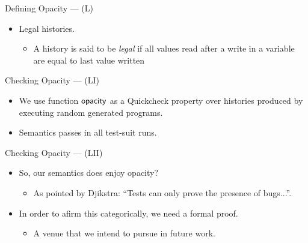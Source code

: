 \documentclass[14pt]{beamer}
\newcommand{\F}[1]{\green{\mathsf{#1}}}
\begin{document}
\begin{frame}{Defining Opacity --- (L)}
   \begin{itemize}
      \item Legal histories.
      \begin{itemize}
         \item A history is said to be \emph{legal}
               if all values read after a write in a variable
               are equal to last value written
      \end{itemize}
   \end{itemize}
\end{frame}
\begin{frame}{Checking Opacity --- (LI)}
   \begin{itemize}
      \item We use function \ensuremath{\F{opacity}} as a Quickcheck property over
            histories produced by executing random generated programs.
      \item Semantics passes in all test-suit runs.
   \end{itemize}
\end{frame}
\begin{frame}{Checking Opacity --- (LII)}
   \begin{itemize}
      \item So, our semantics does enjoy opacity?
      \begin{itemize}
         \item As pointed by Djikstra: ``Tests can only prove the presence of bugs...''.
      \end{itemize}
      \item In order to afirm this categorically, we need a formal proof.
      \begin{itemize}      
         \item A venue that we intend to pursue in future work.
      \end{itemize}
   \end{itemize}
\end{frame}
\end{document}
